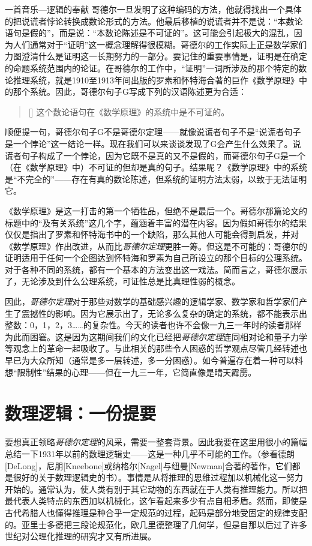 \begin{intro}{一首音乐—逻辑的奉献}
哥德尔一旦发明了这种编码的方法，他就得找出一个具体的把说谎者悖论转换成数论形式的方法。他最后移植的说谎者并不是说：“本数论语句是假的”，而是说：“本数论陈述是不可证的”。这可能会引起极大的混乱，因为人们通常对于“证明”这一概念理解得很模糊。哥德尔的工作实际上正是数学家们力图澄清什么是证明这一长期努力的一部分。要记住的重要事情是，证明是在确定的命题系统范围内的论证。在哥德尔的工作中，“证明”一词所涉及的那个特定的数论推理系统，就是1910至1913年间出版的罗素和怀特海合著的巨作《数学原理》中的那个系统。因此，哥德尔句子G写成下列的汉语陈述更为合适：

\begin{quote}[]
这个数论语句在《数学原理》的系统中是不可证的。
\end{quote}
顺便提一句，哥德尔句子G不是哥德尔定理——就像说谎者句子不是“说谎者句子是一个悖论”这一结论一样。现在我们可以来谈谈发现了G会产生什么效果了。说谎者句子构成了一个悖论，因为它既不是真的又不是假的，而哥德尔句子G是一个（在《数学原理》中）不可证的但却是真的句子。结果呢？《数学原理》中的系统是“不完全的”——存在有真的数论陈述，但系统的证明方法太弱，以致于无法证明它。

《数学原理》是这一打击的第一个牺牲品，但绝不是最后一个。哥德尔那篇论文的标题中的“及有关系统”这几个字，蕴涵着丰富的潜在内容。因为假如哥德尔的结果仅仅是指出了罗素和怀特海书中的一个缺陷，那么其他人可能会得到启发，并对《数学原理》作出改进，从而比\emph{哥德尔定理}更胜一筹。但这是不可能的：哥德尔的证明适用于任何一个企图达到怀特海和罗素为自己所设立的那个目标的公理系统。对于各种不同的系统，都有一个基本的方法变出这一戏法。简而言之，哥德尔展示了，无论涉及到什么公理系统，可证性总是比真理性弱的概念。

因此，\emph{哥德尔定理}对于那些对数学的基础感兴趣的逻辑学家、数学家和哲学家们产生了震撼性的影响。因为它展示出了，无论多么复杂的确定的系统，都不能表示出整数：0，1，2，3……的复杂性。今天的读者也许不会像一九三一年时的读者那样为此而困窘。这是因为这期间我们的文化已经把\emph{哥德尔定理}连同相对论和量子力学等观念上的革命一起吸收了。与此相关的那些令人困惑的哲学观点尽管几经转述也早已为大众所知（通常是多一层转述，多一分困惑）。如今普遍存在着一种可以料想“限制性”结果的心理——但在一九三一年，它简直像是晴天霹雳。

\section{数理逻辑：一份提要}

要想真正领略\emph{哥德尔定理}的风采，需要一整套背景。因此我要在这里用很小的篇幅总结一下1931年以前的数理逻辑史——这是一种几乎不可能的工作。（参看德朗[DeLong]，尼朋[Kneebone]或纳格尔[Nagel]与纽曼[Newman]合著的著作，它们都是很好的关于数理逻辑史的书）。事情是从将推理的思维过程加以机械化这一努力开始的。通常认为，使人类有别于其它动物的东西就在于人类有推理能力。所以把最代表人类特点的东西加以机械化，这乍看起来多少有点自相矛盾。然而，即使是古代希腊人也懂得推理是种合乎一定规范的过程，起码是部分地受固定的规律支配的。亚里士多德把三段论规范化，欧几里德整理了几何学，但是自那以后过了许多世纪对公理化推理的研究才又有所进展。


\end{intro}
